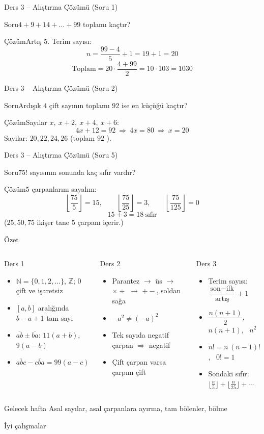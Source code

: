 \documentclass[aspectratio=169,11pt]{beamer}
\newcommand{\soru}[3]{%
\begin{frame}{#1}
  \begin{block}{Soru}\large #2\end{block}
  \pause
  \begin{exampleblock}{Çözüm}\large #3\end{exampleblock}
\end{frame}}
\newcommand{\ab}[1]{\overline{#1}}
\begin{document}
\soru{Ders 3 -- Alıştırma Çözümü (Soru 1)}
{\(4+9+14+\dots+99\) toplamı kaçtır?}
{Artış \(5\). Terim sayısı:
\[n=\frac{99-4}{5}+1=19+1=20\]
\[\text{Toplam}=20\cdot\frac{4+99}{2}=10\cdot 103=1030\]}

\soru{Ders 3 -- Alıştırma Çözümü (Soru 2)}
{Ardışık \(4\) çift sayının toplamı \(92\) ise en küçüğü kaçtır?}
{Sayılar \(x,\ x+2,\ x+4,\ x+6\):
\[4x+12=92\ \Rightarrow\ 4x=80\ \Rightarrow\ x=20\]
Sayılar: \(20,22,24,26\) \quad (toplam \(92\) \checkmark).}

\soru{Ders 3 -- Alıştırma Çözümü (Soru 5)}
{\(75!\) sayısının sonunda kaç sıfır vardır?}
{\(5\) çarpanlarını sayalım:
\[\left\lfloor\frac{75}{5}\right\rfloor=15,\qquad \left\lfloor\frac{75}{25}\right\rfloor=3,\qquad \left\lfloor\frac{75}{125}\right\rfloor=0\]
\[15+3=18\ \text{sıfır}\]
(\(25,50,75\) ikişer tane \(5\) çarpanı içerir.)}

\begin{frame}{Özet}
\begin{columns}[t]
\begin{block}{Ders 1}
\begin{itemize}
\item \(\mathbb{N}=\{0,1,2,\dots\}\), \(\mathbb{Z}\); \(0\) çift ve işaretsiz
\item \([a,b]\) aralığında \(b-a+1\) tam sayı
\item \(\ab{ab}\pm\ab{ba}\): \(11(a+b)\), \(9(a-b)\)
\item \(\ab{abc}-\ab{cba}=99(a-c)\)
\end{itemize}
\end{block}
\begin{block}{Ders 2}
\begin{itemize}
\item Parantez \(\to\) üs \(\to\) \(\times\div\) \(\to\) \(+-\), soldan sağa
\item \(-a^2\neq(-a)^2\)
\item Tek sayıda negatif çarpan \(\Rightarrow\) negatif
\item Çift çarpan varsa çarpım çift
\end{itemize}
\end{block}
\begin{block}{Ders 3}
\begin{itemize}
\item Terim sayısı: \(\dfrac{\text{son}-\text{ilk}}{\text{artış}}+1\)
\item \(\dfrac{n(n+1)}{2}\), \ \(n(n+1)\), \ \(n^2\)
\item \(n!=n\,(n-1)!\), \ \(0!=1\)
\item Sondaki sıfır: \(\lfloor\frac{n}{5}\rfloor+\lfloor\frac{n}{25}\rfloor+\cdots\)
\end{itemize}
\end{block}
\end{columns}
\vspace{6pt}
\begin{alertblock}{Gelecek hafta}
Asal sayılar, asal çarpanlara ayırma, tam bölenler, bölme
\end{alertblock}
\end{frame}

\begin{frame}
\centering\Large İyi çalışmalar
\end{frame}
\end{document}
